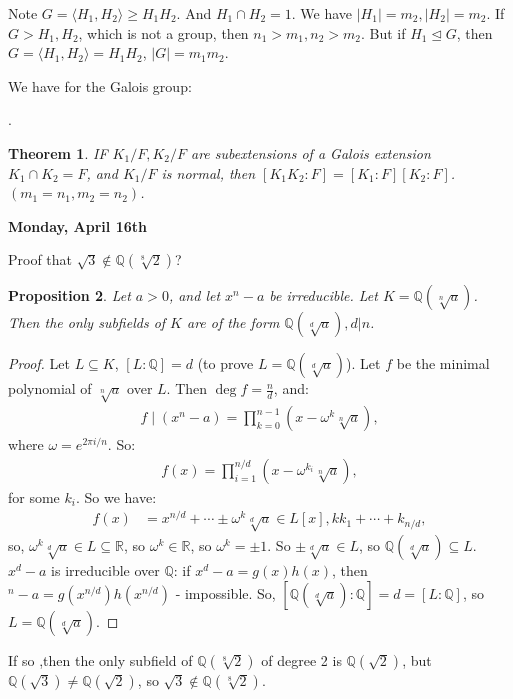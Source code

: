 \documentclass[9pt,reqno,twoside]{amsbook}
\theoremstyle{plain}
\newtheorem{theorem}{Theorem}[chapter]
\numberwithin{section}{chapter}
\numberwithin{equation}{chapter}
\newtheorem{Prop}[theorem]{Proposition}
\theoremstyle{definition}
\theoremstyle{remark}
\theoremstyle{plain}
\newcommand{\norm}{\trianglelefteq}
\newcommand{\sub}{\subseteq}
\newcommand{\R}{\mathbb{R}}
\newcommand{\Q}{\mathbb{Q}}
\newcommand{\bb}{\vspace{3mm}}
\newcommand{\bee}{\begin{equation}\begin{aligned}}
\newcommand{\eee}{\end{aligned}\end{equation}}
\newcommand{\fracc}{\frac}
\newcommand{\qwe}{\sqrt}
\renewcommand{\geq}{\geqslant}
\begin{document}
Note $G = \langle H_1,H_2 \rangle \geq H_1H_2$. And $H_1 \cap H_2 = 1$. We have $|H_1| = m_2,|H_2| = m_2$. If $G > H_1,H_2$, which is not a group, then $n_1 > m_1,n_2> m_2$. But if $H_1 \norm G$, then $G = \langle H_1,H_2 \rangle = H_1H_2$, $|G| = m_1m_2$. 

We have for the Galois group:
\begin{center}
.
\end{center}

\begin{theorem}
IF $K_1/F,K_2/F$ are subextensions of a Galois extension $K_1 \cap K_2 = F$, and $K_1/F$ is normal, then $[K_1K_2:F] = [K_1:F][K_2:F]$. $(m_1 = n_1,m_2 = n_2)$. 
\end{theorem}


\bb

\textbf{Monday, April 16th}

Proof that $\qwe{3} \notin \Q(\sqrt[8]{2})$?
\begin{Prop}
Let $a > 0$, and let $x^n - a$ be irreducible. Let $K  = \Q(\sqrt[n]{a})$. Then the only subfields of $K$ are of the form $\Q(\sqrt[d]{a}), d|n$. 
\end{Prop}

\begin{proof}
Let $L \sub K$, $[L:\Q] = d$ (to prove $L = \Q(\sqrt[d]{a})$). Let $f$ be the minimal polynomial of $\sqrt[n]{a}$ over $L$. Then $\deg f = \fracc{n}{d}$, and:
\bee
f \mid (x^n - a) = \prod_{k = 0}^{n - 1}(x - \omega^k\sqrt[n]{a}),
\eee
where $\omega = e^{2\pi i/n}$. So:
\bee
f(x) = \prod_{i = 1}^{n/d}(x - \omega^{k_i}\sqrt[n]{a}),
\eee
for some $k_i$. So we have:
\bee
f(x) &= x^{n/d} + \cdots \pm \omega^k \sqrt[d]{a} \in L[x], k  k_1 + \cdots + k_{n/d},
\eee
so, $\omega^k\sqrt[d]{a} \in L \sub \R$, so $\omega^k \in \R$, so $\omega^k = \pm1$. So $\pm \sqrt[d]{a} \in L$, so $\Q(\sqrt[d]{a}) \sub L$. $x^d - a$ is irreducible over $\Q$: if $x^d - a = g(x)h(x)$, then $^n - a = g(x^{n/d})h(x^{n/d})$ - impossible. So, $[\Q(\sqrt[d]{a}):\Q] = d = [L:\Q]$, so $L = \Q(\sqrt[d]{a})$. 
\end{proof}

If so ,then the only subfield of $\Q(\sqrt[8]{2})$ of degree 2 is $\Q(\qwe{2})$, but $\Q(\qwe{3}) \neq \Q(\qwe{2})$, so $\qwe{3} \notin \Q(\sqrt[8]{2})$. 
\end{document}
